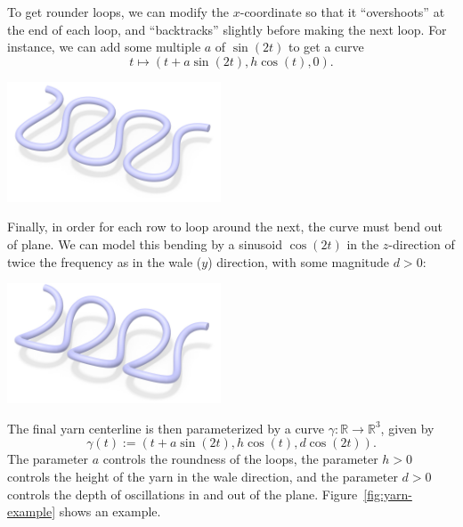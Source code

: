 \documentclass{article}
\begin{document}
To get rounder loops, we can modify the \(x\)-coordinate so that it ``overshoots'' at the end of each loop, and ``backtracks'' slightly before making the next loop.  For instance, we can add some multiple \(a\) of \(\sin(2t)\) to get a curve
\[
   t \mapsto (t + a\sin(2t),h\cos(t),0).
\]

\begin{center}
   \includegraphics[width=2.5in]{images/centerline-flat.jpg}
\end{center}

Finally, in order for each row to loop around the next, the curve must bend out of plane.  We can model this bending by a sinusoid \(\cos(2t)\) in the \(z\)-direction of twice the frequency as in the wale (\(y\)) direction, with some magnitude \(d > 0\):

\begin{center}
   \includegraphics[width=2.5in]{images/centerline-bent.jpg}
\end{center}

The final yarn centerline is then parameterized by a curve \(\gamma: \mathbb{R} \to \mathbb{R}^3\), given by
\begin{equation}
   \boxed{\gamma(t) := \left( t + a\sin(2t), h\cos(t), d\cos(2t) \right).}
\end{equation}
The parameter \(a\) controls the roundness of the loops, the parameter \(h > 0\) controls the height of the yarn in the wale direction, and the parameter \(d > 0\) controls the depth of oscillations in and out of the plane.  Figure~\ref{fig:yarn-example} shows an example.
\end{document}
